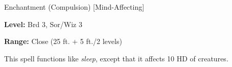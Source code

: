 
Enchantment (Compulsion) [Mind-Affecting]

\textbf{Level:} Brd 3, Sor/Wiz 3

\textbf{Range:} Close (25 ft. + 5 ft./2 levels)

This spell functions like \textit{sleep}, except that it affects 10 HD of creatures.

